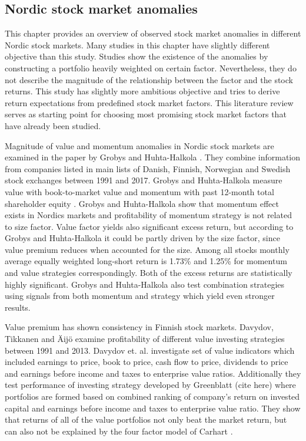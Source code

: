 \documentclass{article}
\begin{document}

\subsection{Nordic stock market anomalies}

This chapter provides an overview of observed stock market anomalies in different Nordic stock markets. Many studies in this chapter have slightly different objective than this study. Studies show the existence of the anomalies by constructing a portfolio heavily weighted on certain factor. Nevertheless, they do not describe the magnitude of the relationship between the factor and the stock returns. This study has slightly more ambitious objective and tries to derive return expectations from predefined stock market factors. This literature review serves as starting point for choosing most promising stock market factors that have already been studied.

Magnitude of value and momentum anomalies in Nordic stock markets are examined in the paper by Grobys and Huhta-Halkola \citeyear{grobys}. They combine information from companies listed in main lists of Danish, Finnish, Norwegian and Swedish stock exchanges between 1991 and 2017. Grobys and Huhta-Halkola measure value with book-to-market value and momentum with past 12-month total shareholder equity%
. Grobys and Huhta-Halkola show that momentum effect exists in Nordics markets and profitability of momentum strategy is not related to size factor. Value factor yields also significant excess return, but according to Grobys and Huhta-Halkola it could be partly driven by the size factor, since value premium reduces when accounted for the size. Among all stocks monthly average equally weighted long-short return is 1.73\% and 1.25\% for momentum and value strategies correspondingly. Both of the excess returns are statistically highly significant. Grobys and Huhta-Halkola also test combination strategies using signals from both momentum and strategy which yield even stronger results.

Value premium has shown consistency in Finnish stock markets. Davydov, Tikkanen and Äijö \citeyear{Davydov2017MagicFV} examine profitability of different value investing strategies between 1991 and 2013. Davydov et. al. investigate set of value indicators which included earnings to price, book to price, cash flow to price, dividends to price and earnings before income and taxes to enterprise value ratios. Additionally they test performance of investing strategy developed by Greenblatt (cite here) where portfolios are formed based on combined ranking of company's return on invested capital and earnings before income and taxes to enterprise value ratio. They show that returns of all of the value portfolios not only beat the market return, but can also not be explained by the four factor model of Carhart \citeyear{https://doi.org/10.1111/j.1540-6261.1997.tb03808.x}.  
\end{document}
